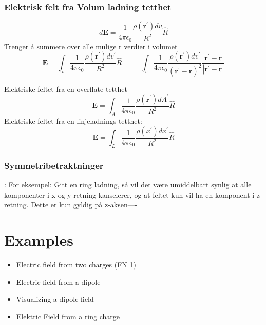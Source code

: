 \documentclass[
12pt, reprint, aip, onecolumn, notitlepage
]{revtex4-1}
\begin{document}
\subsubsection{Elektrisk felt fra Volum ladning tetthet}
\begin{equation}
d \mathbf{E}=\frac{1}{4 \pi \epsilon_{0}} \frac{\rho\left(\mathbf{r}^{\prime}\right) d v}{R^{2}} \hat{R}
\end{equation}
Trenger å summere over alle mulige r verdier i volumet
\begin{equation}
\mathbf{E}=\int_{v} \frac{1}{4 \pi \epsilon_{0}} \frac{\rho\left(\mathbf{r}^{\prime}\right) d v^{\prime}}{R^{2}} \hat{R} = =\int_{v} \frac{1}{4 \pi \epsilon_{0}} \frac{\rho\left(\mathbf{r}^{\prime}\right) d v^{\prime}}{\left(\mathbf{r}^{\prime}-\mathbf{r}\right)^{2}} \frac{\mathbf{r}^{\prime}-\mathbf{r}}{\left|\mathbf{r}^{\prime}-\mathbf{r}\right|}
\end{equation}

Elektriske feltet fra en overflate tetthet
\begin{equation}
\mathbf{E}=\int_{A} \frac{1}{4 \pi \epsilon_{0}} \frac{\rho\left(\mathbf{r}^{\prime}\right) d A^{\prime}}{R^{2}} \hat{R}
\end{equation}
Elektriske feltet fra en linjeladnings tetthet:
\begin{equation}
\mathbf{E}=\int_{L} \frac{1}{4 \pi \epsilon_{0}} \frac{\rho\left(x^{\prime}\right) d x^{\prime}}{R^{2}} \hat{R}
\end{equation}
\subsubsection{Symmetribetraktninger}:
For eksempel: Gitt en ring ladning, så vil det være umiddelbart synlig at alle komponenter i x og y retning kanselerer, og at feltet kun vil ha en komponent i z-retning. Dette er kun gyldig på z-aksen----

\section{Examples}
\begin{itemize}
	\item Electric field from two charges (FN 1)
	\item Electric field from a dipole
	\item Visualizing a dipole field
	\item Elektric Field from a ring charge
\end{itemize}
\end{document}
